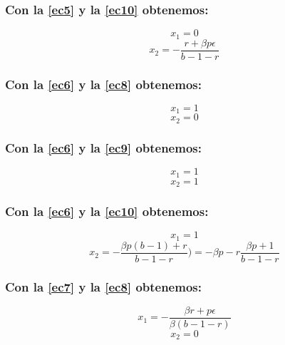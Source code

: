 \documentclass[11pt]{article}
\begin{document}
\subsubsection*{Con la \autoref{ec5} y la \autoref{ec10} obtenemos:}
\vspace{-0.7cm}
\begin{equation}\label{ec15}
x_1=0
\end{equation}
\begin{equation}\label{ec16}
x_2=-\dfrac{r+\beta p\epsilon}{b-1-r}
\end{equation}


\subsubsection*{Con la \autoref{ec6} y la \autoref{ec8} obtenemos:}
\vspace{-0.7cm}
\begin{equation}\label{ec17}
x_1=1
\end{equation}
\begin{equation}\label{ec18}
x_2=0
\end{equation}

\subsubsection*{Con la \autoref{ec6} y la \autoref{ec9} obtenemos:}
\vspace{-0.7cm}
\begin{equation}\label{ec19}
x_1=1
\end{equation}
\begin{equation}\label{ec20}
x_2=1
\end{equation}

\subsubsection*{Con la \autoref{ec6} y la \autoref{ec10} obtenemos:}
\vspace{-0.7cm}
\begin{equation}\label{ec21}
x_1=1
\end{equation}
\begin{equation}\label{ec22}
x_2=-\dfrac{\beta p(b-1)+r}{b-1-r})=-\beta p-r\dfrac{\beta p+1}{b-1-r}
\end{equation}


\subsubsection*{Con la \autoref{ec7} y la \autoref{ec8} obtenemos:}
\vspace{-0.5cm}
\begin{equation}\label{ec23}
x_1=-\dfrac{\beta r+p\epsilon}{\beta(b-1-r)}
\end{equation}
\begin{equation}\label{ec24}
x_2=0
\end{equation}
\end{document}
